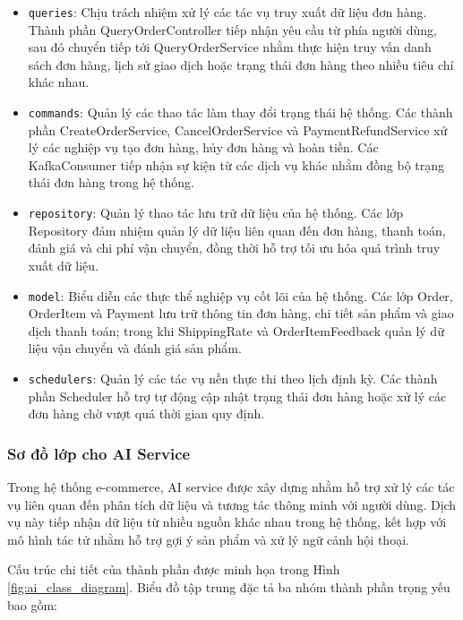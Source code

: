 \begin{itemize}

\item \texttt{queries}: Chịu trách nhiệm xử lý các tác vụ truy xuất dữ liệu đơn hàng. Thành phần QueryOrderController tiếp nhận yêu cầu từ phía người dùng, sau đó chuyển tiếp tới QueryOrderService nhằm thực hiện truy vấn danh sách đơn hàng, lịch sử giao dịch hoặc trạng thái đơn hàng theo nhiều tiêu chí khác nhau.

\item \texttt{commands}: Quản lý các thao tác làm thay đổi trạng thái hệ thống. Các thành phần CreateOrderService, CancelOrderService và PaymentRefundService xử lý các nghiệp vụ tạo đơn hàng, hủy đơn hàng và hoàn tiền. Các KafkaConsumer tiếp nhận sự kiện từ các dịch vụ khác nhằm đồng bộ trạng thái đơn hàng trong hệ thống.

\item \texttt{repository}: Quản lý thao tác lưu trữ dữ liệu của hệ thống. Các lớp Repository đảm nhiệm quản lý dữ liệu liên quan đến đơn hàng, thanh toán, đánh giá và chi phí vận chuyển, đồng thời hỗ trợ tối ưu hóa quá trình truy xuất dữ liệu.

\item \texttt{model}: Biểu diễn các thực thể nghiệp vụ cốt lõi của hệ thống. Các lớp Order, OrderItem và Payment lưu trữ thông tin đơn hàng, chi tiết sản phẩm và giao dịch thanh toán; trong khi ShippingRate và OrderItemFeedback quản lý dữ liệu vận chuyển và đánh giá sản phẩm.

\item \texttt{schedulers}: Quản lý các tác vụ nền thực thi theo lịch định kỳ. Các thành phần Scheduler hỗ trợ tự động cập nhật trạng thái đơn hàng hoặc xử lý các đơn hàng chờ vượt quá thời gian quy định.

\end{itemize}

\subsubsection{Sơ đồ lớp cho AI Service} \label{subsec:ai_class_diagram}

Trong hệ thống e-commerce, AI service được xây dựng nhằm hỗ trợ xử lý các tác vụ liên quan đến phân tích dữ liệu và tương tác thông minh với người dùng. Dịch vụ này tiếp nhận dữ liệu từ nhiều nguồn khác nhau trong hệ thống, kết hợp với mô hình tác tử nhằm hỗ trợ gợi ý sản phẩm và xử lý ngữ cảnh hội thoại. 

Cấu trúc chi tiết của thành phần được minh họa trong Hình \ref{fig:ai_class_diagram}. Biểu đồ tập trung đặc tả ba nhóm thành phần trọng yếu bao gồm:


